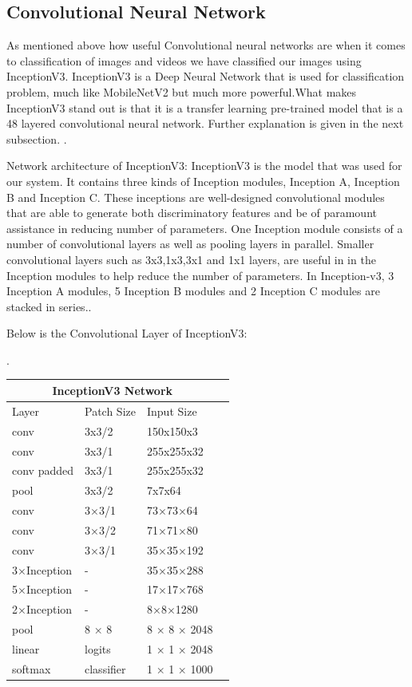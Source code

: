 \subsection{Convolutional Neural Network}
As mentioned above how useful Convolutional neural networks are when it comes to classification of images and videos we have classified our images using InceptionV3. InceptionV3 is a Deep Neural Network that is used for classification problem, much like MobileNetV2 but much more powerful.What makes InceptionV3 stand out is that it is a transfer learning pre-trained model that is a 48 layered convolutional neural network. Further explanation is given in the next subsection.
\vspace{5mm}.

Network architecture of InceptionV3:
InceptionV3 is the model that was used for our system. It contains three kinds of Inception modules, Inception A, Inception B and Inception C. These inceptions are well-designed convolutional modules that are able to generate both discriminatory features and be of paramount assistance in reducing number of parameters. One Inception module consists of a number of convolutional layers as well as pooling layers in parallel. Smaller convolutional layers such as 3x3,1x3,3x1 and 1x1 layers, are useful in in the Inception modules to help reduce the number of parameters. In Inception-v3, 3 Inception A modules, 5 Inception B modules and 2 Inception C modules are stacked in series.\cite{guan2019deep}.
\vspace{5mm}

Below is the Convolutional Layer of InceptionV3:

\vspace{3}.
\begin{tabular}{ |p{3cm}||p{3cm}|p{3cm}|p{3cm}|}
    \hline
    \multicolumn{3}{|c|}{InceptionV3 Network} \\
    \hline
     Layer & Patch Size & Input Size\\
    \hline 
    conv & 3x3/2 & 150x150x3\\
    \hline
    conv & 3x3/1 & 255x255x32\\
    \hline
    conv padded & 3x3/1 & 255x255x32\\
    \hline
    pool & 3x3/2 & 7x7x64\\
    \hline
    conv & 3×3/1 & 73×73×64\\
    \hline
    conv & 3×3/2 & 71×71×80\\
    \hline
    conv & 3×3/1 & 35×35×192\\
    \hline
    3×Inception & - & 35×35×288\\
    \hline
    5×Inception & - & 17×17×768\\
    \hline
    2×Inception & - & 8×8×1280\\
    \hline
     pool & 8 × 8 & 8 × 8 × 2048\\
    \hline 
    linear & logits & 1 × 1 × 2048\\
    \hline
    softmax & classifier & 1 × 1 × 1000\\
    \hline
\end{tabular}
\vspace{5mm}

